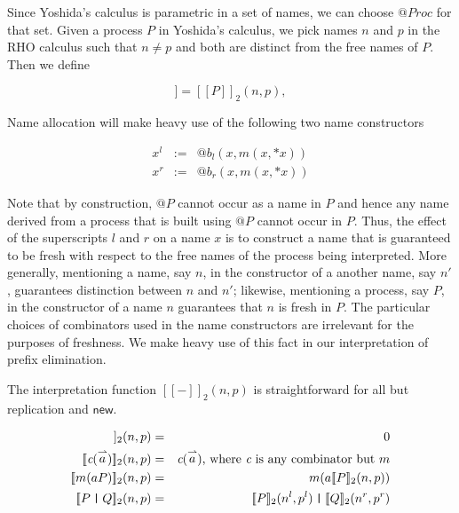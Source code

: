 \documentclass{llncs}
\makeatletter
\newcommand{\ldb}{[\![}
\newcommand{\rdb}{]\!]}
\newcommand{\id}[1]{\texttt{#1}}
\newcommand{\pzero}{\mathbin{0}}
\newcommand{\juxtap}{\mathbin{\id{|}}}
\newcommand{\quotep}[1]{\mathsf{@}#1}
\newcommand{\meaningof}[1]{\ldb #1 \rdb}
\newcommand{\QProc}{\quotep{\mathbin{Proc}}}
\newcommand{\vect}[1]{\stackrel{\rightharpoonup}{#1}}
\makeatother
\begin{document}
Since Yoshida's calculus is parametric in a set of names, we can
choose $\QProc$ for that set.  Given a process $P$ in Yoshida's
calculus, we pick names $n$ and $p$ in the RHO calculus such that $n \neq p$
and both are distinct from the free names of $P$.  Then we define

\begin{equation*}
  \meaningof{P} = \meaningof{P}_2(n, p),
\end{equation*}

Name allocation will make heavy use of the following two name
constructors

\begin{eqnarray*}
  x^l & := & \quotep{b_{l}(x,m(x,*x))} \\
  x^r & := & \quotep{b_{r}(x,m(x,*x))}
\end{eqnarray*}

Note that by construction, $\quotep{P}$ cannot occur as a name in $P$
and hence any name derived from a process that is built using
$\quotep{P}$ cannot occur in $P$. Thus, the effect of the superscripts
$l$ and $r$ on a name $x$ is to construct a name that is guaranteed to
be fresh with respect to the free names of the process being
interpreted. More generally, mentioning a name, say $n$, in the
constructor of a another name, say $n'$, guarantees distinction
between $n$ and $n'$; likewise, mentioning a process, say $P$, in the
constructor of a name $n$ guarantees that $n$ is fresh in $P$. The
particular choices of combinators used in the name
constructors are irrelevant for the purposes of freshness. We
make heavy use of this fact in our interpretation of prefix
elimination.

The interpretation function $\meaningof{-}_2(n, p)$ is straightforward
for all but replication and $\mathsf{new}$.

\begin{eqnarray*}
    \meaningof{\pzero}_2 (n,p)
      & = &
       \pzero \\
    \meaningof{\emph{c}(\vect{a})}_2 (n,p) 
      & = & 
      \emph{c}(\vect{a})\mbox{, where $\emph{c}$ is any combinator but $m$} \\
    \meaningof{m(aP)}_2 (n,p) 
      & = & 
          m(a \meaningof{P}_2 (n,p)) \\
    \meaningof{P \juxtap Q}_2 (n,p) 
      & = & 
    \meaningof{P}_2 (n^l, p^l)
         \juxtap \meaningof{Q}_2 (n^r, p^r) \\ 
\end{eqnarray*}
\end{document}
